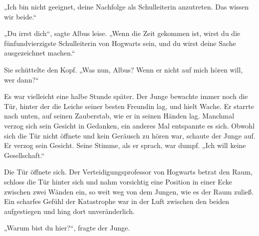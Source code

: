 „Ich bin nicht geeignet, deine Nachfolge als Schulleiterin anzutreten. Das wissen wir beide.“

„Du irrst dich“, sagte Albus leise. „Wenn die Zeit gekommen ist, wirst du die fünfundvierzigste Schulleiterin von Hogwarts sein, und du wirst deine Sache ausgezeichnet machen.“

Sie schüttelte den Kopf.
„Was nun, Albus? Wenn er nicht auf mich hören will, wer dann?“

\later


Es war vielleicht eine halbe Stunde später. Der Junge bewachte immer noch die Tür, hinter der die Leiche seiner besten Freundin lag, und hielt Wache. Er starrte nach unten, auf seinen Zauberstab, wie er in seinen Händen lag. Manchmal verzog sich sein Gesicht in Gedanken, ein anderes Mal entspannte es sich. Obwohl sich die Tür nicht öffnete und kein Geräusch zu hören war, schaute der Junge auf. Er verzog sein Gesicht. Seine Stimme, als er sprach, war dumpf. „Ich will keine Gesellschaft.“


Die Tür öffnete sich. Der Verteidigungsprofessor von Hogwarts betrat den Raum, schloss die Tür hinter sich und nahm vorsichtig eine Position in einer Ecke zwischen zwei Wänden ein, so weit weg von dem Jungen, wie es der Raum zuließ. Ein scharfes Gefühl der Katastrophe war in der Luft zwischen den beiden aufgestiegen und hing dort unveränderlich.

„Warum bist du hier?“, fragte der Junge.

